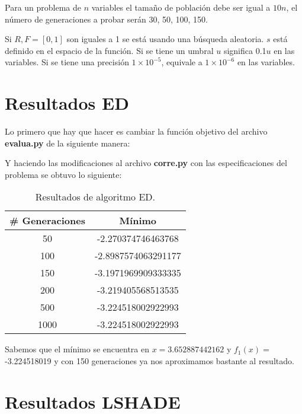 \documentclass[conference]{IEEEtran}
\begin{document}
Para un problema de $n$ variables el tamaño de población debe ser igual a $10n$, el número de generaciones a probar serán 30, 50, 100, 150.

Si $R, F = [0,1]$ son iguales a 1 se está usando una búsqueda aleatoria. $s$ está definido en el espacio de la función. Si se tiene un umbral $u$ significa 0.1$u$ en las variables. Si se tiene una precisión $1 \times 10^{-5}$, equivale a $1 \times 10^{-6}$ en las variables.


\section{Resultados ED}

Lo primero que hay que hacer es cambiar la función objetivo del archivo \textbf{evalua.py} de la siguiente manera:




Y haciendo las modificaciones al archivo \textbf{corre.py} con las especificaciones del problema se obtuvo lo siguiente:

\begin{table}[!hbp]   
	\caption{Resultados de algoritmo ED.}                                                                                                                
		\centering                                       
		\begin{tabular}{cc}
			\hline                                             
			\#{} Generaciones & Mínimo \\                     
			\hline 
			50 & -2.270374746463768\\                                            
			100 & -2.8987574063291177\\
			150 & -3.1971969909333335\\
			200 & -3.219405568513535\\
			500 & -3.224518002922993\\
			1000 & -3.224518002922993\\
			\hline                                             
		\end{tabular}
	\end{table}	
	
	Sabemos que el mínimo se encuentra en $x = 3.652887442162$ y $f_{1}(x)= $ -3.224518019 y con 150 generaciones ya nos aproximamos bastante al resultado.

\section{Resultados LSHADE}
\end{document}
